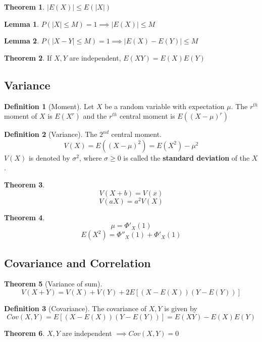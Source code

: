 \documentclass[10pt, a4paper]{extarticle}
\theoremstyle{definition}
\newtheorem{thm}{Theorem}
\newtheorem{lem}{Lemma}[thm]
\newtheorem{defn}{Definition}
\begin{document}
	\begin{thm}
		$|E(X)|\leq E(|X|)$
	\end{thm}
	\begin{lem}
		$P(|X|\leq M)=1\implies |E(X)|\leq M$
	\end{lem}
	\begin{lem}
		$P(|X-Y|\leq M)=1\implies |E(X)-E(Y)|\leq M$
	\end{lem}

	\begin{thm}
		If $X,Y$ are independent, $E(XY)=E(X)E(Y)$
	\end{thm}
	
	\subsection{Variance}
	\begin{defn}[Moment]
		Let $X$ be a random variable with expectation $\mu$. The $r^{th}$ moment of $X$ is $E(X^r)$ and the $r^{th}$ central moment is $E((X-\mu)^r)$
	\end{defn}

	\begin{defn}[Variance]
		The $2^{nd}$ central moment.
		\[V(X)=E((X-\mu)^2)=E(X^2)-\mu^2\]
		$V(X)$ is denoted by $\sigma^2$, where $\sigma\geq 0$ is called the \textbf{standard deviation} of the $X$.
	\end{defn}

	\begin{thm}
		\[V(X+b)=V(x)\]\[V(aX)=a^2V(X)\]
	\end{thm}


	\begin{thm}
		\[\mu=\Phi'_X(1)\]\[E(X^2)=\Phi''_X(1)+\Phi'_X(1)\]
	\end{thm}

	\subsection{Covariance and Correlation}
	\begin{thm}[Variance of sum]
		\[V(X+Y)=V(X)+V(Y)+2E[(X-E(X))(Y-E(Y))]\]
	\end{thm}
	\begin{defn}[Covariance]
		The covariance of $X,Y$ is given by
		\[Cov(X,Y)=E[(X-E(X))(Y-E(Y))]=E(XY)-E(X)E(Y)\]
	\end{defn}
	\begin{thm}
		$X,Y$ are independent $\implies Cov(X,Y)=0$
	\end{thm}
\end{document}
